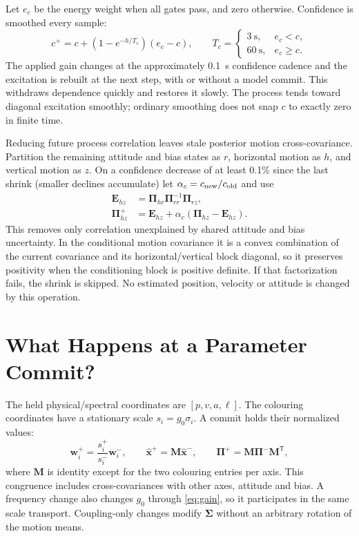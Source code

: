 \documentclass[conference]{IEEEtran}
\newcommand{\vc}[1]{\bm{#1}}
\newcommand{\mt}[1]{\bm{#1}}
\newcommand{\tr}{^{\mathsf T}}
\begin{document}
Let $e_c$ be the energy weight when all gates pass, and zero otherwise.
Confidence is smoothed every sample:
\begin{equation}
 c^+=c+(1-e^{-h/T_c})(e_c-c),\qquad
 T_c=\begin{cases}3~\mathrm s,&e_c<c,\\60~\mathrm s,&e_c\ge c.\end{cases}
 \label{eq:confidence}
\end{equation}
The applied gain changes at the approximately 0.1~s confidence cadence
and the excitation is rebuilt at the next step, with or without a model
commit. This
withdraws dependence quickly and restores it slowly. The process tends
toward diagonal excitation smoothly; ordinary smoothing does not snap
$c$ to exactly zero in finite time.

Reducing future process correlation leaves stale posterior motion
cross-covariance. Partition the remaining attitude and bias states as
$r$, horizontal motion as $h$, and vertical motion as $z$. On a confidence
decrease of at least 0.1\% since the last shrink (smaller declines
accumulate) let $\alpha_c=c_{\rm new}/c_{\rm old}$ and use
\begin{align}
 \mt E_{hz}&=\mt\Pi_{hr}\mt\Pi_{rr}^{-1}\mt\Pi_{rz},\nonumber\\
 \mt\Pi_{hz}^+&=\mt E_{hz}+
                \alpha_c(\mt\Pi_{hz}-\mt E_{hz}).
 \label{eq:shrink}
\end{align}
This removes only correlation unexplained by shared attitude and bias
uncertainty. In the conditional motion covariance it is a convex
combination of the current covariance and its horizontal/vertical block
diagonal, so it preserves positivity when the conditioning block is
positive definite. If that factorization fails, the shrink is skipped.
No estimated position, velocity or attitude is changed by this operation.

\section{What Happens at a Parameter Commit?}
\label{sec:commits}
The held physical/spectral coordinates are $[p,v,a,\ell]$. The colouring
coordinates have a stationary scale
$s_i=g_0\sigma_i$. A commit holds their normalized values:
\begin{equation}
 \vc w_i^+=\frac{s_i^+}{s_i^-}\vc w_i^-,\qquad
 \hat{\vc x}^+=\mt M\hat{\vc x}^-,\qquad
 \mt\Pi^+=\mt M\mt\Pi^-\mt M\tr,
 \label{eq:transport}
\end{equation}
where $\mt M$ is identity except for the two colouring entries per axis.
This congruence includes cross-covariances with other axes, attitude and
bias. A frequency change also changes $g_0$ through \cref{eq:gain}, so it
participates in the same scale transport. Coupling-only changes modify
$\mt\Sigma$ without an arbitrary rotation of the motion means.
\end{document}
